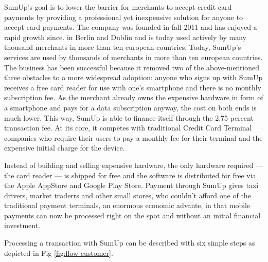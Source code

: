 \documentclass[a4paper, oneside]{csthesis}
\begin{document}
SumUp's goal is to lower the barrier for merchants to accept credit card payments by providing a professional yet inexpensive solution for anyone to accept card payments. The company was founded in fall 2011 and has enjoyed a rapid growth since.
in Berlin and Dublin and is today used actively by many thousand merchants in more than ten european countries. Today, SumUp's services are used by thousands of merchants in more than ten european countries.
The business has been successful because it removed two of the above-mentioned three obstacles to a more widespread adoption: anyone who signs up with SumUp receives a free card reader for use with one's smartphone and there is no monthly subscription fee. As the merchant already owns the expensive hardware in form of a smartphone and pays for a data subscription anyway, the cost on both ends is much lower. This way, SumUp is able to finance itself through the 2.75 percent transaction fee. At its core, it competes with traditional Credit Card Terminal companies who require their users to pay a monthly fee for their terminal and the expensive initial charge for the device.

Instead of building and selling expensive hardware, the only hardware required --- the card reader --- is shipped for free and the software is distributed for free via the Apple AppStore and Google Play Store.
Payment through SumUp gives taxi drivers, market traderrs and other small stores, who couldn't afford one of the traditional payment terminals, an enormous economic advante, in that mobile payments can now be processed right on the spot and without an initial financial investment.


Processing a transaction with SumUp can be described with six simple steps as depicted in Fig \ref{fig:flow-customer}.
\end{document}
